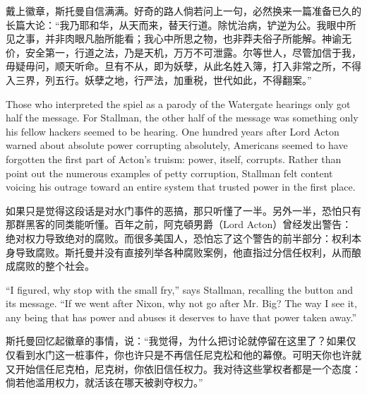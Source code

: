 \ifdefined\chs
戴上徽章，斯托曼自信满满。好奇的路人倘若问上一句，必然换来一篇准备已久的长篇大论：``我乃耶和华，从天而来，替天行道。除忧治病，铲逆为公。我眼中所见之事，并非肉眼凡胎所能看；我心中所思之物，也非莽夫俗子所能解。神谕无价，安全第一，行道之法，乃是天机，万万不可泄露。尔等世人，尽管加信于我，毋疑毋问，顺天听命。旦有不从，即为妖孽，从此名姓入簿，打入非常之所，不得入三界，列五行。妖孽之地，行严法，加重税，世代如此，不得翻案。''
\fi

\ifdefined\eng
Those who interpreted the spiel as a parody of the Watergate hearings only got half the message. For Stallman, the other half of the message was something only his fellow hackers seemed to be hearing. One hundred years after Lord Acton warned about absolute power corrupting absolutely, Americans seemed to have forgotten the first part of Acton's truism: power, itself, corrupts. Rather than point out the numerous examples of petty corruption, Stallman felt content voicing his outrage toward an entire system that trusted power in the first place.
\fi

\ifdefined\chs
如果只是觉得这段话是对水门事件的恶搞，那只听懂了一半。另外一半，恐怕只有那群黑客的同类能听懂。百年之前，阿克頓男爵（Lord Acton）曾经发出警告：绝对权力导致绝对的腐败。而很多美国人，恐怕忘了这个警告的前半部分：权利本身导致腐败。斯托曼并没有直接列举各种腐败案例，他直指过分信任权利，从而酿成腐败的整个社会。
\fi

\ifdefined\eng
``I figured, why stop with the small fry,'' says Stallman, recalling the button and its message. ``If we went after Nixon, why not go after Mr. Big? The way I see it, any being that has power and abuses it deserves to have that power taken away.''
\fi

\ifdefined\chs
斯托曼回忆起徽章的事情，说：``我觉得，为什么把讨论就停留在这里了？如果仅仅看到水门这一桩事件，你也许只是不再信任尼克松和他的幕僚。可明天你也许就又开始信任尼克柏，尼克树，你依旧信任权力。我对待这些掌权者都是一个态度：倘若他滥用权力，就活该在哪天被剥夺权力。''
\fi

\theendnotes
\setcounter{endnote}{0}
